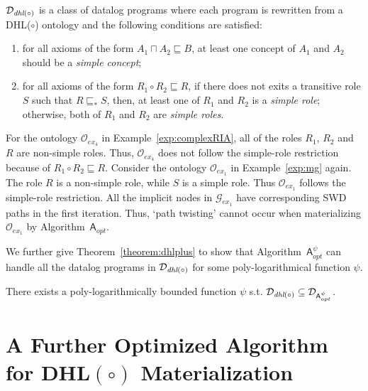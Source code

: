 \documentclass[final,1p,times]{elsarticle}
\begin{document}
\begin{definition}\label{def:dhlplus}
$\mathcal{D}_{\textit{\text{dhl}}(\circ)}$ is a class of datalog programs where each program
is rewritten from a DHL($\circ$) ontology and the following
conditions are satisfied:
\begin{enumerate}[leftmargin=4ex,label=\arabic*.]
\item for all axioms of the form $A_1\sqcap A_2\sqsubseteq B$,
    at least one concept of $A_1$ and $A_2$ should be a \emph{simple concept};
\item for all axioms of the form $R_1\circ R_2\sqsubseteq R$,
    if there does not exits a transitive role $S$ such that $R\sqsubseteq_* S$, then,
    at least one of $R_1$ and $R_2$ is a \emph{simple role}; otherwise, both of $R_1$ and $R_2$ are \emph{simple roles}.
\end{enumerate}
\end{definition}

\begin{example}
For the ontology $\mathcal{O}_{ex_4}$ in Example~\ref{exp:complexRIA}, all of the roles
$R_1$, $R_2$ and $R$ are non-simple roles. Thus, $\mathcal{O}_{ex_4}$ does not follow
the simple-role restriction because of $R_1\circ R_2\sqsubseteq R$.
Consider the ontology $\mathcal{O}_{ex_1}$
in Example~\ref{exp:mg} again. The role $R$ is a non-simple role, while $S$ is a simple role.
Thus $\mathcal{O}_{ex_1}$ follows the simple-role restriction. All the implicit nodes
in $\mathcal{G}_{ex_1}$ have corresponding SWD paths in the first iteration.
Thus, `path twisting' cannot occur when materializing $\mathcal{O}_{ex_1}$ by Algorithm~$\mathsf{A}_{opt}$.
\end{example}

We further give Theorem~\ref{theorem:dhlplus} to show that Algorithm~$\mathsf{A}_{opt}^{\psi}$ can handle
all the datalog programs in $\mathcal{D}_{\textit{\text{dhl}}(\circ)}$ for some poly-logarithmical function $\psi$.

\begin{theorem}\label{theorem:dhlplus}
There exists a poly-logarithmically bounded function $\psi$ s.t. $\mathcal{D}_{\textit{\text{dhl}}(\circ)}\subseteq\mathcal{D}_{\mathsf{A}_{opt}^{\psi}}$.
\end{theorem}


\section{A Further Optimized Algorithm for DHL$(\circ)$ Materialization}
\label{sec:practicalAlg}
\end{document}
